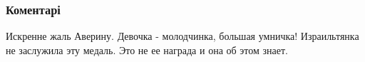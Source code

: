  
 
 
 
 
\subsubsection{Коментарі}

\begin{itemize}
 

Искренне жаль Аверину. Девочка - молодчинка, большая умничка! Израильтянка не
заслужила эту медаль. Это не ее награда и она об этом знает.

\end{itemize}

